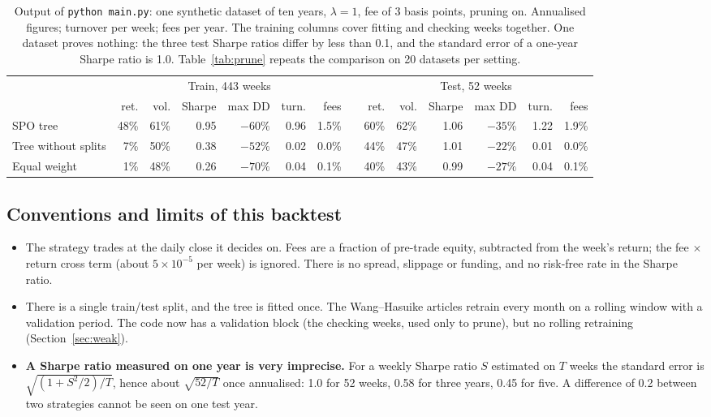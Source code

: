 \documentclass[11pt,a4paper]{article}
\newcommand{\1}{\mathbf{1}}
\begin{document}
\begin{table}[H]
\centering\footnotesize\setlength{\tabcolsep}{3.2pt}
\begin{tabular}{@{}l rrrrrr c rrrrrr@{}}
\toprule
& \multicolumn{6}{c}{Train, 443 weeks} && \multicolumn{6}{c}{Test, 52 weeks}\\
\cmidrule{2-7}\cmidrule{9-14}
& ret. & vol. & Sharpe & max DD & turn. & fees && ret. & vol. & Sharpe & max DD & turn. & fees\\
\midrule
SPO tree & 48\% & 61\% & 0.95 & $-60\%$ & 0.96 & 1.5\% && 60\% & 62\% & 1.06 & $-35\%$ & 1.22 & 1.9\%\\
Tree without splits & 7\% & 50\% & 0.38 & $-52\%$ & 0.02 & 0.0\% && 44\% & 47\% & 1.01 & $-22\%$ & 0.01 & 0.0\%\\
Equal weight & 1\% & 48\% & 0.26 & $-70\%$ & 0.04 & 0.1\% && 40\% & 43\% & 0.99 & $-27\%$ & 0.04 & 0.1\%\\
\bottomrule
\end{tabular}
\caption{Output of \texttt{python main.py}: one synthetic dataset of ten years, $\lambda=1$, fee of 3 basis points, pruning on. Annualised figures; turnover per week; fees per year. The training columns cover fitting and checking weeks together. One dataset proves nothing: the three test Sharpe ratios differ by less than 0.1, and the standard error of a one-year Sharpe ratio is 1.0. Table~\ref{tab:prune} repeats the comparison on 20 datasets per setting.}
\label{tab:demo}
\end{table}

\subsection{Conventions and limits of this backtest}
\begin{itemize}
\item The strategy trades at the daily close it decides on. Fees are a fraction of pre-trade equity, subtracted from the week's return; the fee $\times$ return cross term (about $5\times10^{-5}$ per week) is ignored. There is no spread, slippage or funding, and no risk-free rate in the Sharpe ratio.
\item There is a single train/test split, and the tree is fitted once. The Wang--Hasuike articles retrain every month on a rolling window with a validation period. The code now has a validation block (the checking weeks, used only to prune), but no rolling retraining (Section~\ref{sec:weak}).
\item \textbf{A Sharpe ratio measured on one year is very imprecise.} For a weekly Sharpe ratio $S$ estimated on $T$ weeks the standard error is $\sqrt{(1+S^2/2)/T}$, hence about $\sqrt{52/T}$ once annualised: 1.0 for 52 weeks, 0.58 for three years, 0.45 for five. A difference of 0.2 between two strategies cannot be seen on one test year.
\end{itemize}
\end{document}
